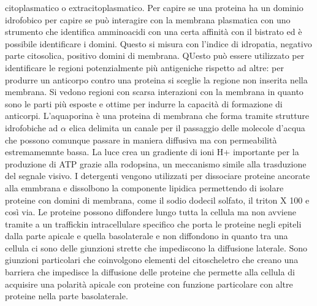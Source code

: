 citoplasmatico o extracitoplasmatico. Per capire se una proteina ha un dominio idrofobico per capire se pu\`o interagire con la membrana plasmatica con uno strumento che identifica 
amminoacidi con una certa affinit\`a con il bistrato ed \`e possibile identificare i domini. Questo si misura con l'indice di idropatia, negativo parte citosolica, positivo domini di 
membrana. QUesto pu\`o essere utilizzato per identificare le regioni potenzialmente pi\`u antigeniche rispetto ad altre: per produrre un anticorpo contro una proteina si sceglie la
regione non inserita nella membrana. Si vedono regioni con scarsa interazioni con la membrana in quanto sono le parti pi\`u esposte e ottime per indurre la capacit\`a di formazione di 
anticorpi. L'aquaporina \`e una proteina di membrana che forma tramite strutture idrofobiche ad $\alpha$ elica delimita un canale per il passaggio delle molecole d'acqua che possono 
comunque passare in maniera diffusiva ma con permeabilit\`a estremamemnte bassa. La luce crea un gradiente di ioni H+ importante per la produzione di ATP grazie alla rodopsina, un 
meccanismo simile alla trasduzione del segnale visivo. I detergenti vengono utilizzati per dissociare proteine ancorate alla emmbrana e dissolbono la componente lipidica permettendo 
di isolare proteine con domini di membrana, come il sodio dodecil solfato, il triton X 100 e cos\`i via. Le proteine possono diffondere lungo tutta la cellula ma non avviene tramite 
a un traffickin intracellulare specifico che porta le proteine negli epiteli dalla parte apicale e quella basolaterale e non diffondono in quanto tra una cellula ci sono delle giunzioni
strette che impediscono la diffusione laterale. Sono giunzioni particolari che coinvolgono elementi del citoscheletro che creano una barriera che impedisce la diffusione delle proteine 
che permette alla cellula di acquisire una polarit\`a apicale con proteine con funzione particolare con altre proteine nella parte basolaterale. 
